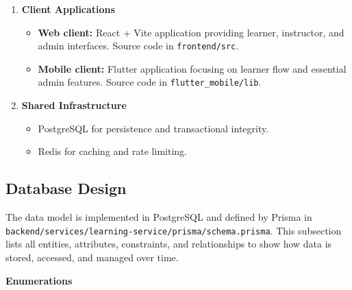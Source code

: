 \begin{enumerate}
\begin{itemize}
        \end{itemize}
    \item \textbf{Client Applications}
        \begin{itemize}
            \item \textbf{Web client:} React + Vite application providing learner, instructor, and admin interfaces. Source code in \texttt{frontend/src}.
            \item \textbf{Mobile client:} Flutter application focusing on learner flow and essential admin features. Source code in \texttt{flutter\_mobile/lib}.
        \end{itemize}
    \item \textbf{Shared Infrastructure}
        \begin{itemize}
            \item PostgreSQL for persistence and transactional integrity.
            \item Redis for caching and rate limiting.
        \end{itemize}
\end{enumerate}

\subsection{Database Design}

The data model is implemented in PostgreSQL and defined by Prisma in \texttt{backend/services/learning-service/prisma/schema.prisma}. This subsection lists all entities, attributes, constraints, and relationships to show how data is stored, accessed, and managed over time.

\textbf{Enumerations}

